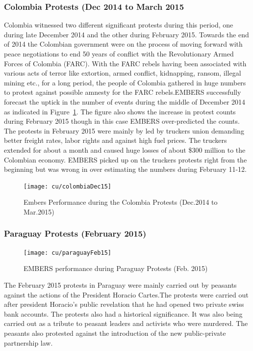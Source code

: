 \subsubsection*{Colombia Protests (Dec 2014 to March 2015}
Colombia witnessed two different significant protests during this period, one during late December 2014
and the other during February 2015. Towards the end of 2014 the Colombian government were on the process
of moving forward with peace negotiations to end 50 years of conflict with the Revolutionary Armed Forces
of Colombia (FARC). With the FARC rebels having been associated with various acts of terror like extortion, armed conflict,
kidnapping, ransom, illegal mining etc., for a long period, the people of Colombia gathered in huge numbers
 to protest against possible amnesty for the FARC rebels.EMBERS successfully forecast the uptick in the number of events during the
middle of December 2014 as indicated in Figure~\ref{fig:colombiaDec14}. The figure also shows the increase in protest counts
during February 2015 though in this case EMBERS over-predicted the counts. The protests in February 2015
were mainly by led by truckers union demanding better freight rates, labor rights and against high fuel prices.
The truckers extended for about a month and caused huge losses of about \$300
million to the Colombian economy.
EMBERS picked up on the truckers protests right from the beginning but was wrong in over estimating the numbers during
February 11-12.

\begin{figure} %
\centering
\texttt{[image: cu/colombiaDec15]}
\caption{Embers Performance during the Colombia Protests (Dec.2014 to Mar.2015)}
\label{fig:colombiaDec14}
\end{figure}

\subsubsection*{Paraguay Protests (February 2015)}
\begin{figure} %
\centering
\texttt{[image: cu/paraguayFeb15]}
\caption{EMBERS performance during Paraguay Protests (Feb. 2015)}
\label{fig:paraguay15}
\end{figure}
The February 2015 protests in Paraguay were mainly carried out by peasants
against the actions of the President Horacio Cartes.The protests were carried out after
president Horacio's public revelation that he had opened two private swiss bank accounts.
The protests also had a historical significance. It was also being carried out as a tribute
to peasant leaders and activists who were murdered. The peasants also protested
against the introduction of the new public-private partnership law.

